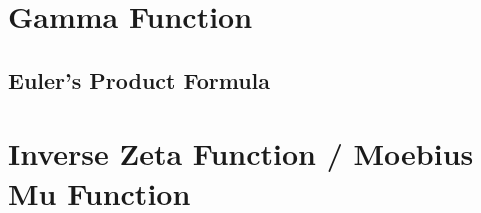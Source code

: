 \newpage

\section{Gamma Function}


\subsection{Euler's Product Formula}


\section{Inverse Zeta Function / Moebius Mu Function}
